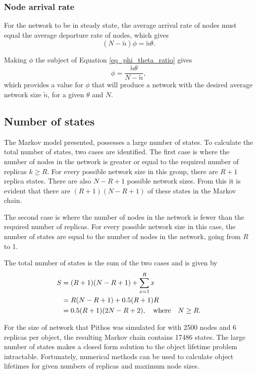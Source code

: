 \documentclass[10pt,a4paper,conference]{IEEEtran}
\begin{document}
\subsubsection{Node arrival rate}

For the network to be in steady state, the average arrival rate of nodes must equal the average departure rate of nodes, which gives
%
\begin{equation}
    (N - \tilde{n})\phi = \tilde{n}\theta.\label{eq_phi_theta_ratio}
\end{equation}

Making $\phi$ the subject of Equation \eqref{eq_phi_theta_ratio} gives
%
\begin{equation}
    \phi = \frac{\tilde{n}\theta}{N - \tilde{n}},\label{eq_phi}
\end{equation}
%
which provides a value for $\phi$ that will produce a network with the desired average network size $\tilde{n}$, for a given $\theta$ and $N$.

\subsection{Number of states}

The Markov model presented, possesses a large number of states. To calculate the total number of states, two cases are identified. The first case is where the number of nodes in the network is greater or equal to the required number of replicas $k \geq R$. For every possible network size in this group, there are $R+1$ replica states. There are also $N - R + 1$ possible network sizes. From this it is evident that there are $(R+1)(N - R + 1)$ of these states in the Markov chain.

The second case is where the number of nodes in the network is fewer than the required number of replicas. For every possible network size in this case, the number of states are equal to the number of nodes in the network, going from $R$ to 1.

The total number of states is the sum of the two cases and is given by
%
\begin{align}
       S & = (R+1)(N - R + 1) + \sum_{x=1}^{R} x\label{eq_states_num_init}\\
         & = R(N - R + 1) + 0.5 (R + 1) R\notag\\
         & = 0.5 (R + 1) (2 N - R + 2), \quad\textrm{where}\quad N \geq R. \label{eq_states_num_ans}
\end{align}

For the size of network that Pithos was simulated for with 2500 nodes and 6 replicas per object, the resulting Markov chain contains 17486 states. The large number of states makes a closed form solution to the object lifetime problem intractable. Fortunately, numerical methods can be used to calculate object lifetimes for given numbers of replicas and maximum node sizes.
\end{document}
